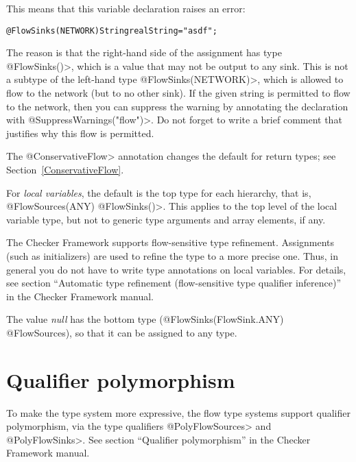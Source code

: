 This means that this variable declaration raises an error:

\begin{alltt}
@FlowSinks(NETWORK) String realString = "asdf";
\end{alltt}

The reason is that the right-hand side of the assignment has type
\<@FlowSinks({})>, which is a value that may not be output to any sink.
This is not a subtype of the left-hand type \<@FlowSinks(NETWORK)>, which
is allowed to flow to the network (but to no other sink).  If the given
string is permitted to flow to the network, then you can suppress the
warning by annotating the declaration with \<@SuppressWarnings("flow")>.
Do not forget to write a brief comment that justifies why this flow is permitted.

The \<@ConservativeFlow> annotation changes the default for return types;
see Section~\ref{ConservativeFlow}.


For \emph{local variables}, the default is the top type for each
hierarchy, that is, \<@FlowSources(ANY) @FlowSinks({})>.  This applies to
the top level of the local variable type, but not to generic type arguments
and array elements, if any.

The Checker
Framework supports flow-sensitive type refinement.  Assignments (such as
initializers) are used to refine the type to a more precise one.  Thus, in
general you do not have to write type annotations on local variables.  For
details, see section ``Automatic type refinement (flow-sensitive type
qualifier inference)'' in the Checker Framework manual.


The value \emph{null} has the bottom type (@FlowSinks(FlowSink.ANY) @FlowSources), 
so that it can be assigned to any type. 


\section{Qualifier polymorphism}

To make the type system more expressive, the flow type systems support
qualifier polymorphism, via the type qualifiers \<@PolyFlowSources> and
\<@PolyFlowSinks>.
See section ``Qualifier polymorphism'' in the Checker Framework manual.



